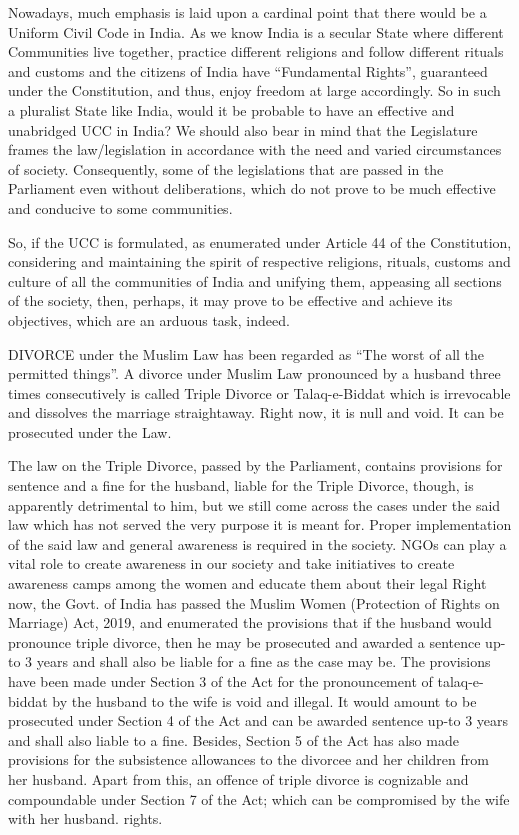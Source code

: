 \begin{multicols}{2}
\noi
Nowadays, much emphasis is laid upon a cardinal point that there would be a Uniform Civil
Code in India. As we know India is a secular State where different Communities live
together, practice different religions and follow different rituals and customs and the citizens
of India have “Fundamental Rights”, guaranteed under the Constitution, and thus, enjoy
freedom at large accordingly. So in such a pluralist State like India, would it be probable to
have an effective and unabridged UCC in India? We should also bear in mind that the
Legislature frames the law/legislation in accordance with the need and varied circumstances
of society. Consequently, some of the legislations that are passed in the Parliament even
without deliberations, which do not prove to be much effective and conducive to some
communities.

\noi
So, if the UCC is formulated, as enumerated under Article 44 of the Constitution, considering
and maintaining the spirit of respective religions, rituals, customs and culture of all the
communities of India and unifying them, appeasing all sections of the society, then, perhaps,
it may prove to be effective and achieve its objectives, which are an arduous task, indeed. 

\noi
DIVORCE under the Muslim Law has been regarded as “The worst of all the permitted
things”. A divorce under Muslim Law pronounced by a husband three times consecutively is
called Triple Divorce or Talaq-e-Biddat which is irrevocable and dissolves the marriage
straightaway. Right now, it is null and void. It can be prosecuted under the Law.

\noi
The law on the Triple Divorce, passed by the Parliament, contains provisions for sentence
and a fine for the husband, liable for the Triple Divorce, though, is apparently detrimental to him, but we still come across the cases under the said law which has not served the very
purpose it is meant for. Proper implementation of the said law and general awareness is
required in the society. NGOs can play a vital role to create awareness in our society and take
initiatives to create awareness camps among the women and educate them about their legal Right now, the Govt. of India has passed the Muslim Women (Protection of Rights on
Marriage) Act, 2019, and enumerated the provisions that if the husband would pronounce
triple divorce, then he may be prosecuted and awarded a sentence up-to 3 years and shall also
be liable for a fine as the case may be. The provisions have been made under Section 3 of the
Act for the pronouncement of talaq-e-biddat by the husband to the wife is void and illegal. It
would amount to be prosecuted under Section 4 of the Act and can be awarded sentence up-to
3 years and shall also liable to a fine. Besides, Section 5 of the Act has also made provisions
for the subsistence allowances to the divorcee and her children from her husband. Apart from
this, an offence of triple divorce is cognizable and compoundable under Section 7 of the Act;
which can be compromised by the wife with her husband.
rights. 


\end{multicols}
